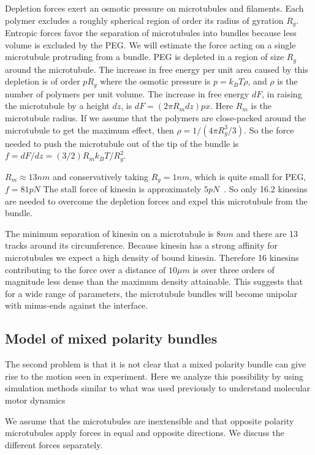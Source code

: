 \documentclass[11pt]{ucthesis}
\begin{document}
Depletion forces exert an osmotic pressure on microtubules and filaments. 
Each polymer excludes a roughly spherical region of order its radius of
gyration $R_g$.
Entropic forces favor the separation of microtubules into bundles because less
volume is excluded by the PEG. We will estimate the force acting on a
single microtubule protruding from a bundle. 
PEG is depleted in a region of size $R_g$ around the microtubule. The increase in
free energy per unit area caused by this depletion is of order $p R_g$  where the osmotic pressure is  $p = k_B T \rho$, and
$\rho$ is the number of polymers per unit volume. The increase in free energy
$dF$, in raising the microtubule by a height $dz$, is $dF = (2\pi R_m dz) p x$. Here $R_m$
is the microtubule radius. If we assume that the
polymers are close-packed around the microtubule to get the maximum effect, then $\rho = 1/(4 \pi R_g^3/3)$.
So the force needed to push the microtubule out of the tip of the bundle is
$f = dF/dz = (3/2) R_m k_B T/R_g^2$.

$R_m \approx 13 nm$ and conservatively taking $R_g = 1nm$, which is quite small
for PEG, $f = 81 pN$
The stall force of kinesin is approximately $5pN$~\cite{meyhofer1995force}. So only 16.2 kinesins are needed to overcome
the depletion forces and expel this microtubule from the bundle. 

The minimum separation of kinesin on a microtubule is $8nm$ and there are 13
tracks around its circumference. Because kinesin has a strong affinity for
microtubules we expect a high density of bound kinesin. Therefore 16 kinesins
contributing to the force over
a distance of $10 \mu m$ is over three orders of magnitude less dense
than the maximum density attainable.
This suggests that for a wide range of parameters, the microtubule bundles will
become unipolar with minus-ends against the interface.


\subsection{Model of mixed polarity bundles}

The second problem is
that it is not clear that a mixed polarity bundle can give rise to the motion
seen in experiment. Here we analyze this possibility by using simulation methods
similar to what was used previously to understand molecular motor dynamics~\cite{deutsch2015photomechanical}

We assume that the microtubules are inextensible and that opposite polarity
microtubules apply forces in equal and opposite directions. We discuss the
different forces separately.
\end{document}

